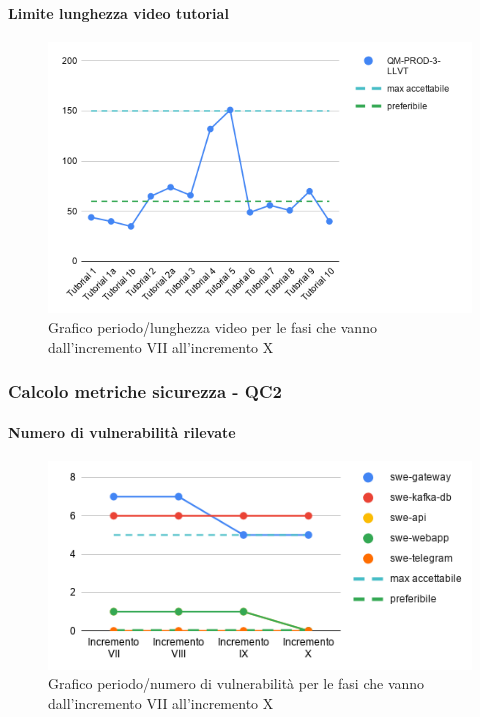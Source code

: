 \paragraph{Limite lunghezza video tutorial}
\begin{figure}[H]
			\centering
			\includegraphics[width=0.8\linewidth]{./res/images/LLVT.png}
			\caption{Grafico periodo/lunghezza video per le fasi che vanno dall'incremento VII all'incremento X}
			\label{fig:Grafico periodo/lunghezza video per le fasi che vanno dall'incremento VII all'incremento X}
	\end{figure}

\subsubsection{Calcolo metriche sicurezza - QC2}
\paragraph{Numero di vulnerabilità rilevate}
\begin{figure}[H]
			\centering
			\includegraphics[width=0.8\linewidth]{./res/images/QM-PROD-4-NVUL.png}
			\caption{Grafico periodo/numero di vulnerabilità per le fasi che vanno dall'incremento VII all'incremento X}
			\label{fig:Grafico periodo/numero di vulnerabilità per le fasi che vanno dall'incremento VII all'incremento X}
	\end{figure}
